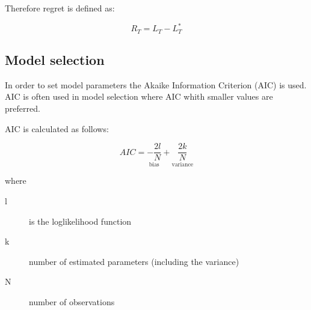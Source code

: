 Therefore regret is defined as:

\begin{equation*}
R_T = L_T - L^*_T
\end{equation*}


\subsection{Model selection}
In order to set model parameters the Akaike Information Criterion (AIC) is
used. AIC is often used in model selection where AIC whith smaller values are
preferred.

AIC is calculated as follows:

\begin{equation}
\label{eq:aicformula}
AIC = \underset{\text{bias}}{-\frac{2l}{N}} + 
\underset{\text{variance}}{\frac{2k}{N}}
\end{equation}

\noindent where 

\begin{description}
\item[l] is the loglikelihood function
\item[k] number of estimated parameters (including the variance)
\item[N] number of observations
\end{description}


